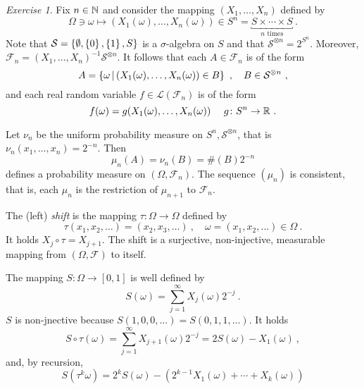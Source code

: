 \documentclass[12pt,a4paper]{amsart}
\theoremstyle{plain}
\theoremstyle{definition}
\theoremstyle{remark}
\newtheorem{exercise}[theorem]{Exercise}
\begin{document}
\begin{exercise}
Fix $n \in \mathbb{N}$ and consider the mapping
$(X_1,\dots,X_n)$ defined by
\begin{equation*}
  \Omega \ni \omega \mapsto (X_1(\omega),\dots,X_n(\omega)) \in
  S^{n} = \underbracket{S \times \cdots \times S}_{\text{$n$ times}} \ .
\end{equation*}
Note that $\mathcal S = \left\{\emptyset, \left\{0\right\}, \left\{1\right\}, S\right\}$ is a
$\sigma$-algebra on $S$ and that $\mathcal S^{\otimes n} =
2^{S^n}$. Moreover, $\mathcal F_n = (X_1,\dots,X_n)^{-1} \mathcal
S^{\otimes n}$. It follows that each $A \in \mathcal F_n$ is of the form
\begin{equation*}
  A = \left\{\omega \, \middle| \, (X_1(\omega),\dots,X_n(\omega)) \in B \right\} \ , \quad
    B \in \mathcal S^{\otimes n} \ ,
  \end{equation*}
  and each real random variable $f \in \mathcal L(\mathcal
  F_n)$ is of the form
  \begin{equation*}
    f(\omega) = g(X_1(\omega),\dots,X_n(\omega)) \ \quad g \colon S^n
    \to \reals \ .
  \end{equation*}

Let $\nu_n$ be the uniform probability measure on
$S^n,\mathcal S^{\otimes n}$, that is $\nu_n(x_1,\dots,x_n) = 2^{-n}$. Then
\begin{equation*}
  \mu_n(A) = \nu_n(B) = \#(B) 2^{-n}
\end{equation*}
defines a probability measure on $(\Omega, \mathcal F_n)$. The
sequence $(\mu_n)$ is consistent, that is, each $\mu_n$ is
the restriction of $\mu_{n+1}$ to $\mathcal F_n$.

The (left) \emph{shift} is the mapping $\tau \colon \Omega \to \Omega$
defined by 
\begin{equation*}
  \tau(x_1,x_2,\dots) = (x_2,x_3,\dots) \ , \quad \omega =
  (x_1,x_2,\dots) \in \Omega \ .
\end{equation*}
It holds $X_j\circ \tau = X_{j+1}$. The shift is a surjective,
non-injective,  measurable
mapping from $(\Omega, \mathcal F)$ to itself.

The mapping $S \colon
\Omega \to [0,1]$ is well defined by
\begin{equation*}
  S(\omega) = \sum_{j=1}^\infty X_j(\omega) 2^{-j} \ .
\end{equation*}
$S$ is non-jnective because $S(1,0,0,\dots) = S(0,1,1,\dots)$. It holds
\begin{equation*}
  S\circ \tau (\omega) = \sum_{j=1}^\infty X_{j+1}(\omega) 2^{-j} = 2
  S(\omega) - X_1(\omega) \ ,
\end{equation*}
and, by recursion,
\begin{equation}\label{eq:shift-recursion}
  S(\tau^k\omega) = 2^k S(\omega) - \left(2^{k-1} X_1(\omega) + \cdots + X_k(\omega)\right)
\end{equation}


\end{exercise}
\end{document}
